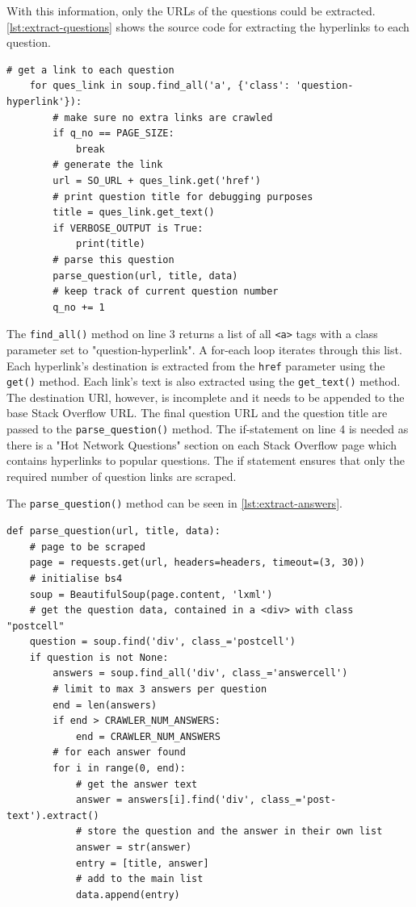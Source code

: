 \documentclass[12pt,a4paper]{article}
\newcommand{\captionstyle}[1] {
    \small{#1}
}
\begin{document}
With this information, only the URLs of the questions could be extracted. \cref{lst:extract-questions} shows the source code for extracting the hyperlinks to each question.

\begin{lstlisting}[caption={\captionstyle{Extracting the URL of each question on a Stack Overflow page.}}, label={lst:extract-questions}]
    # get a link to each question
    for ques_link in soup.find_all('a', {'class': 'question-hyperlink'}):
        # make sure no extra links are crawled
        if q_no == PAGE_SIZE:
            break
        # generate the link
        url = SO_URL + ques_link.get('href')
        # print question title for debugging purposes
        title = ques_link.get_text()
        if VERBOSE_OUTPUT is True:
            print(title)
        # parse this question
        parse_question(url, title, data)
        # keep track of current question number
        q_no += 1
\end{lstlisting}

The \texttt{find\_all()} method on line 3 returns a list of all \texttt{<a>} tags with a class parameter set to "question-hyperlink". A for-each loop iterates through this list. Each hyperlink's destination is extracted from the \texttt{href} parameter using the \texttt{get()} method. Each link's text is also extracted using the \texttt{get\_text()} method. The destination URl, however, is incomplete and it needs to be appended to the base Stack Overflow URL. The final question URL and the question title are passed to the \texttt{parse\_question()} method. The if-statement on line 4 is needed as there is a "Hot Network Questions" section on each Stack Overflow page which contains hyperlinks to popular questions. The if statement ensures that only the required number of question links are scraped.

The \texttt{parse\_question()} method can be seen in \cref{lst:extract-answers}.
\begin{lstlisting}[caption={\captionstyle{Extracting answers for a specific Stack Overflow question.}}, label={lst:extract-answers}]
    def parse_question(url, title, data):
    # page to be scraped
    page = requests.get(url, headers=headers, timeout=(3, 30))
    # initialise bs4
    soup = BeautifulSoup(page.content, 'lxml')
    # get the question data, contained in a <div> with class "postcell"
    question = soup.find('div', class_='postcell')
    if question is not None:
        answers = soup.find_all('div', class_='answercell')
        # limit to max 3 answers per question
        end = len(answers)
        if end > CRAWLER_NUM_ANSWERS:
            end = CRAWLER_NUM_ANSWERS
        # for each answer found
        for i in range(0, end):
            # get the answer text
            answer = answers[i].find('div', class_='post-text').extract()
            # store the question and the answer in their own list
            answer = str(answer)
            entry = [title, answer]
            # add to the main list
            data.append(entry)
\end{lstlisting}
\end{document}
